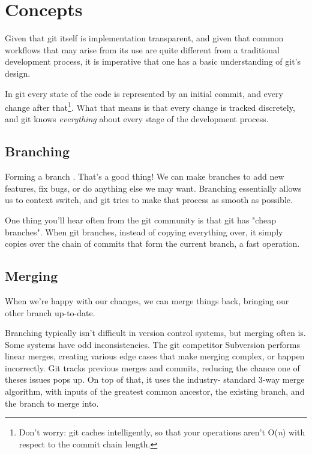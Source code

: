 \documentclass[11pt,letterpaper,twoside]{report}
\begin{document}
\chapter{Concepts}

Given that git itself is implementation transparent, and given that common
workflows that may arise from its use are quite different from a traditional
development process, it is imperative that one has a basic understanding of
git's design.

In git every state of the code is represented by an initial commit, and every
change after that\footnote{Don't worry: git caches intelligently, so that your
operations aren't O(\textit{n}) with respect to the commit chain length.}. What
that means is that every change is tracked discretely, and git knows
\emph{everything} about every stage of the development process.

\section{Branching}

Forming a branch . That's a good
thing! We can make branches to add new features, fix bugs, or do anything else
we may want. Branching essentially allows us to context switch, and git tries to
make that process as smooth as possible.

One thing you'll hear often from the git community is that git has "cheap
branches". When git branches, instead of copying everything over, it simply
copies over the chain of commits that form the current branch, a fast operation.

\section{Merging}

When we're happy with our changes, we can merge things back, bringing our other
branch up-to-date.

Branching typically isn't difficult in version control systems, but merging
often is. Some systems have odd inconsistencies. The git competitor Subversion
performs linear merges, creating various edge cases that make merging complex,
or happen incorrectly. Git tracks previous merges and commits, reducing the
chance one of theses issues pops up. On top of that, it uses the industry-
standard 3-way merge algorithm, with inputs of the greatest common ancestor, the
existing branch, and the branch to merge into.
\end{document}

